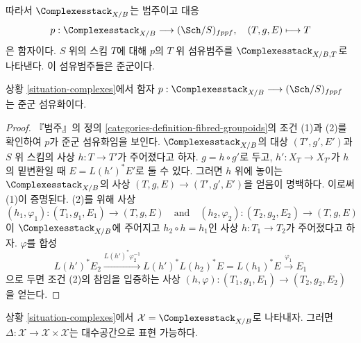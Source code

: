 \noindent
따라서 $\Complexesstack_{X/B}$는 범주이고 대응
$$
p : \Complexesstack_{X/B} \longrightarrow (\Sch/S)_{fppf},
\quad
(T, g, E) \longmapsto T
$$
은 함자이다. $S$ 위의 스킴 $T$에 대해 $p$의 $T$ 위 섬유범주를
$\Complexesstack_{X/B, T}$로 나타낸다. 이 섬유범주들은 준군이다.

\begin{lemma}
\label{lemma-complexes-fibred-in-groupoids}
상황 \ref{situation-complexes}에서 함자
$p : \Complexesstack_{X/B} \longrightarrow (\Sch/S)_{fppf}$
는 준군 섬유화이다.
\end{lemma}

\begin{proof}
『범주』의 정의 \ref{categories-definition-fibred-groupoids}의 조건 (1)과 (2)를
확인하여 $p$가 준군 섬유화임을 보인다. $\Complexesstack_{X/B}$의 대상
$(T', g', E')$과 $S$ 위 스킴의 사상 $h : T \to T'$가 주어졌다고 하자.
$g = h \circ g'$로 두고, $h' : X_T \to X_{T'}$가 $h$의 밑변환일 때
$E = L(h')^*E'$로 둘 수 있다. 그러면 $h$ 위에 놓이는
$\Complexesstack_{X/B}$의 사상 $(T, g, E) \to (T', g', E')$을 얻음이 명백하다.
이로써 (1)이 증명된다. (2)를 위해 사상
$$
(h_1, \varphi_1) : (T_1, g_1, E_1) \to (T, g, E)
\quad\text{and}\quad
(h_2, \varphi_2) : (T_2, g_2, E_2) \to (T, g, E)
$$
이 $\Complexesstack_{X/B}$에 주어지고 $h_2 \circ h = h_1$인 사상
$h : T_1 \to T_2$가 주어졌다고 하자. $\varphi$를 합성
$$
L(h')^*E_2
\xrightarrow{L(h')^*\varphi_2^{-1}}
L(h')^*L(h_2)^*E = L(h_1)^*E
\xrightarrow{\varphi_1}
E_1
$$
으로 두면 조건 (2)의 참임을 입증하는 사상
$(h, \varphi) : (T_1, g_1, E_1) \to (T_2, g_2, E_2)$
을 얻는다.
\end{proof}

\begin{lemma}
\label{lemma-complexes-diagonal}
상황 \ref{situation-complexes}에서 $\mathcal{X} = \Complexesstack_{X/B}$로
나타내자. 그러면 $\Delta : \mathcal{X} \to \mathcal{X} \times \mathcal{X}$는
대수공간으로 표현 가능하다.
\end{lemma}

